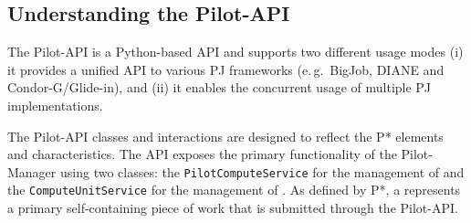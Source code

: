 \documentclass[conference]{IEEEtran}
\begin{document}


\subsection{Understanding the Pilot-API}




The Pilot-API is a Python-based API and supports two different usage modes (i)
it provides a unified API to various PJ frameworks (e.\,g.\ BigJob, DIANE and
Condor-G/Glide-in), and (ii) it enables the concurrent usage of multiple PJ
implementations.

The Pilot-API classes and interactions are designed to reflect the P*
elements and characteristics.
The API exposes the primary functionality of the Pilot-Manager using two
classes: the \texttt{Pilot\-Compute\-Service} for the management of \pilots
and the \texttt{Compute\-Unit\-Service} for the management of \cus. 
As defined by P*, a \cu represents a primary self-containing piece of work that
is submitted through the Pilot-API. 
\end{document}
